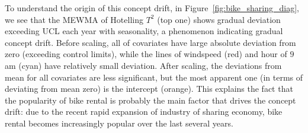 \documentclass[twoside,11pt]{article}
\begin{document}
To understand the origin of this concept drift, in Figure~\ref{fig:bike_sharing_diag}, we see that the MEWMA of Hotelling $T^2$ (top one) shows gradual deviation exceeding UCL each year with seasonality, a phenomenon indicating gradual concept drift. Before scaling, all of covariates have large absolute deviation from zero (exceeding control limits), while the lines of windspeed (red) and hour of $9$am (cyan) have relatively small deviation. After scaling, the deviations from mean for all covariates are less significant, but the most apparent one (in terms of deviating from mean zero) is the intercept (orange). This explains the fact that the popularity of bike rental is probably the main factor that drives the concept drift: due to the recent rapid expansion of industry of sharing economy, bike rental becomes increasingly popular over the last several years.  
\end{document}
